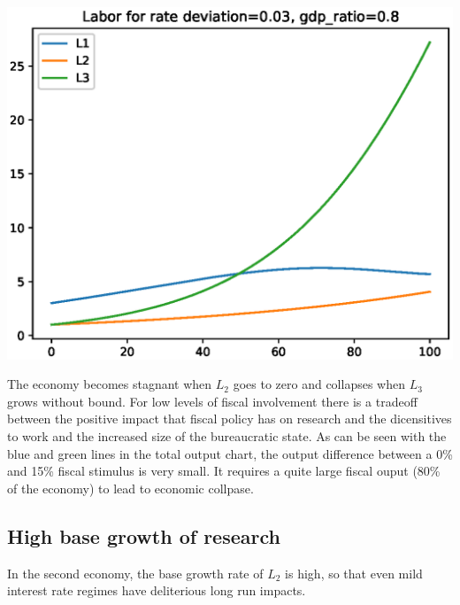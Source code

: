 \documentclass[12pt]{article}
\theoremstyle{definition}
\begin{document}
\begin{minipage}{\linewidth}
\begin{framed}
\begin{minipage}[t]{.48\textwidth}
\includegraphics[width=1\textwidth]{images/econ_0_run_4_labor}
\end{minipage}\hfill
\end{framed}
\end{minipage}

The economy becomes stagnant when \(L_2\) goes to zero and collapses when \(L_3\) grows without bound.  For low levels of fiscal involvement there is a tradeoff between the positive impact that fiscal policy has on research and the dicensitives to work and the increased size of the bureaucratic state.  As can be seen with the blue and green lines in the total output chart, the output difference between a 0\% and 15\% fiscal stimulus is very small.  It requires a quite large fiscal ouput (80\% of the economy) to lead to economic collpase.

\subsection{High base growth of research}

In the second economy, the base growth rate of \(L_2\) is high, so that even mild interest rate regimes have deliterious long run impacts.
\end{document}
